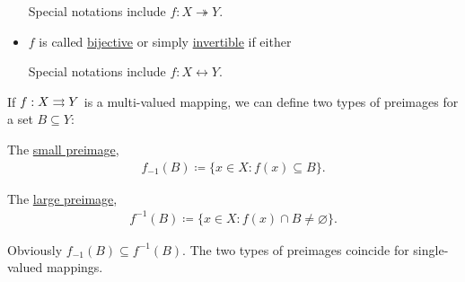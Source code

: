 \begin{definition}
\begin{itemize}
    Special notations include $f: X \twoheadrightarrow Y$.

    \item\label{def:function_invertibility/bijection} $f$ is called \ul{bijective} or simply \ul{invertible} if either

    Special notations include $f: X \longleftrightarrow Y$.
  \end{itemize}

  If $f : X \rightrightarrows Y$ is a multi-valued mapping, we can define two types of preimages for a set $B \subseteq Y$:
  \begin{defenum}
    \item The \ul{small preimage},
    \begin{align*}
      f_{-1}(B) \coloneqq \{ x \in X \colon f(x) \subseteq B \}.
    \end{align*}

    \item The \ul{large preimage},
    \begin{align*}
      f^{-1}(B) \coloneqq \{ x \in X \colon f(x) \cap B \neq \varnothing \}.
    \end{align*}
  \end{defenum}

  Obviously $f_{-1}(B) \subseteq f^{-1}(B)$. The two types of preimages coincide for single-valued mappings.
\end{definition}

